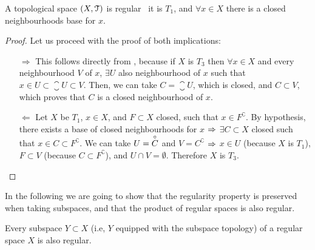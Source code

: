 \begin{theorem}
	\label{th:regular-space-characterisation-2}
	A topological space $(X, \EuScript{T})$ is regular \iff\ it is $T_1$, and $\forall x\in X$ there is a closed neighbourhoods base for $x$.
\end{theorem}

\begin{proof}
Let us proceed with the proof of both implications:
	\begin{itemize}
		\item[$\boxed{\Rightarrow}$] This follows directly from , because if $X$ is $T_3$ then $\forall x\in X$ and every neighbourhood $V$ of $x$, $\exists U$ also neighbourhood of $x$ such that $x\in U\subset \closure{U}\subset V$. Then, we can take $C=\closure{U}$, which is closed, and $C\subset V$, which proves that $C$ is a closed neighbourhood of $x$.
		\item[$\boxed{\Leftarrow}$] Let $X$ be $T_1$, $x\in X$, and $F\subset X$ closed, such that $x\in F^\complement$. By hypothesis, there exists a base of closed neighbourhoods for $x$ $\Rightarrow$ $\exists C\subset X$ closed such that $x\in C\subset F^\complement$.
		We can take $U=\overset{\circ}{C}$ and $V=C^\complement$ $\Rightarrow$ $x\in U$ (because $X$ is $T_1$), $F\subset V$ (because $C\subset F^\complement$), and $U\cap V =\emptyset$. Therefore $X$ is $T_3$.
	\end{itemize}
\end{proof}

In the following we are going to show that the regularity property is preserved when taking subspaces, and that the product of regular spaces is also regular.

\begin{theorem}
	\label{th:regular-subspace}
	Every subspace $Y\subset X$ (i.e, $Y$ equipped with the subspace topology) of a regular space $X$ is also regular.
\end{theorem}

